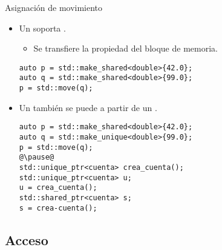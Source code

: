\begin{frame}[t,fragile]{Asignación de movimiento}
\begin{itemize}
  \item Un  soporta .
    \begin{itemize}
      \item Se transfiere la propiedad del bloque de memoria.
    \end{itemize}
\begin{lstlisting}
auto p = std::make_shared<double>{42.0};
auto q = std::make_shared<double>{99.0};
p = std::move(q);
\end{lstlisting}

  \item Un  también se puede 
        a partir de un .
\begin{lstlisting}[escapechar=@]
auto p = std::make_shared<double>{42.0};
auto q = std::make_unique<double>{99.0};
p = std::move(q);
@\pause@
std::unique_ptr<cuenta> crea_cuenta();
std::unique_ptr<cuenta> u;
u = crea_cuenta();
std::shared_ptr<cuenta> s;
s = crea-cuenta();
\end{lstlisting}

\end{itemize}
\end{frame}

\subsection{Acceso}

